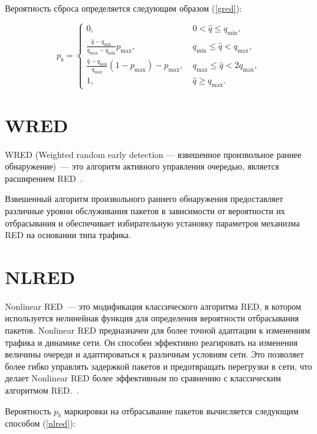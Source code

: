 Вероятность сброса определяется следующим образом (\ref{gred}):

\begin{equation}
\label{gred}
p_{b} =\begin{cases}
        0, &  \  0 < \hat{q} \leqslant q_{\min}, 
        \\
        \frac{\hat{q} - q_{\min}}{q_{\max} - q_{\min}} p_{\max}, & \ q_{\min} \leqslant \hat{q} < q_{\max}, 
        \\
        \frac{\hat{q} - q_{\min}}{q_{\max}}(1-p_{\max}) - p_{\max}, & \ q_{\max} \leqslant \hat{q} < 2q_{\max}, 
        \\
        1, &  \ \hat{q} \geqslant  q_{\max}.
\end{cases}
\end{equation}


\section{WRED}
\label{chap2:sec4}


WRED (Weighted random early detection --- взвешенное произвольное раннее
обнаружение)~--- это алгоритм активного управления очередью, является
расширением RED~\cite{WRED}.

Взвешенный алгоритм произвольного раннего обнаружения предоставляет
различные уровни обслуживания пакетов в зависимости от вероятности их
отбрасывания и обеспечивает избирательную установку параметров
механизма RED на основании типа трафика.



\section{NLRED}
\label{chap2:sec5}


Nonlinear RED~--- это модификация классического алгоритма RED, в
котором используется нелинейная функция для определения
вероятности отбрасывания пакетов. Nonlinear RED предназначен для более точной адаптации к изменениям трафика и динамике сети. 
Он способен эффективно реагировать на изменения величины очереди и адаптироваться к различным условиям сети. 
Это позволяет более гибко управлять задержкой пакетов и предотвращать перегрузки в сети, 
что делает Nonlinear RED более эффективным по сравнению с классическим алгоритмом RED.~\cite{NLRED1, NLRED2}.   


Вероятность $p_{b}$ маркировки на
отбрасывание пакетов вычисляется следующим способом (\ref{nlred}):

